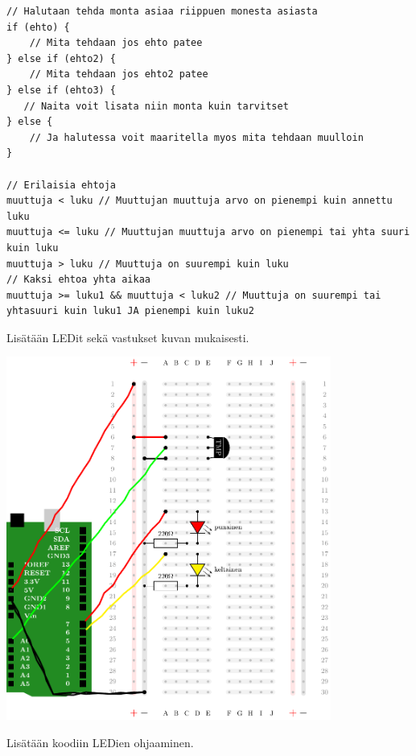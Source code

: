 \begin{tcolorbox}[colback=white,title=Vinkkejä Arduinolla koodaamiseen!,colbacktitle=purple!90,breakable]
\begin{lstlisting}
// Halutaan tehda monta asiaa riippuen monesta asiasta
if (ehto) {
    // Mita tehdaan jos ehto patee
} else if (ehto2) {
    // Mita tehdaan jos ehto2 patee
} else if (ehto3) {
   // Naita voit lisata niin monta kuin tarvitset
} else {
    // Ja halutessa voit maaritella myos mita tehdaan muulloin
}

// Erilaisia ehtoja
muuttuja < luku // Muuttujan muuttuja arvo on pienempi kuin annettu luku
muuttuja <= luku // Muuttujan muuttuja arvo on pienempi tai yhta suuri kuin luku
muuttuja > luku // Muuttuja on suurempi kuin luku
// Kaksi ehtoa yhta aikaa
muuttuja >= luku1 && muuttuja < luku2 // Muuttuja on suurempi tai yhtasuuri kuin luku1 JA pienempi kuin luku2
\end{lstlisting}
\end{tcolorbox}

Lisätään LEDit sekä vastukset kuvan mukaisesti.

\includegraphics[width=0.8\textwidth]{kuvat/kuva13.pdf}

Lisätään koodiin LEDien ohjaaminen.

